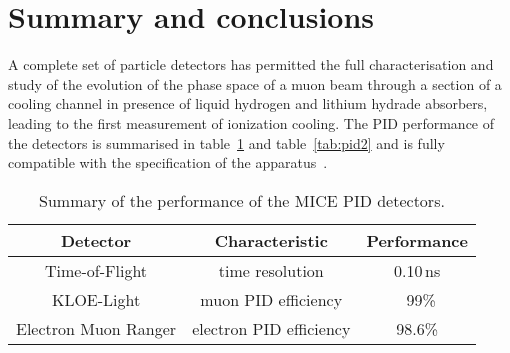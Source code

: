 \graphicspath{{80-Conclusions/Figures/}}

\section{Summary and conclusions}
\label{Sect:Conclusions}

A complete set of particle detectors has permitted the full characterisation and study of the evolution of the phase space of a muon beam through a section of a cooling channel in presence of liquid hydrogen and lithium hydrade absorbers, leading to the first measurement of ionization cooling.
The PID performance of the detectors is summarised in table~\ref{tab:pid1} and table~\ref{tab:pid2} and is fully compatible with the specification of the apparatus~\cite{NOTE21}.

\begin{table}[htb!]
	\caption{Summary of the performance of the MICE PID detectors.}
  \begin{center}
	\begin{tabular}{|c|c|c|}
   	\hline
	  \textbf{Detector}              & \textbf{Characteristic}            & \textbf{Performance} \\
		\hline
    Time-of-Flight        & time resolution           & 0.10\,ns    \\
    KLOE-Light            & muon PID efficiency       & ~99\%       \\
    Electron Muon Ranger  & electron PID efficiency   & 98.6\%      \\
    \hline
  \end{tabular}
	\label{tab:pid1}
  \end{center}
\end{table}


